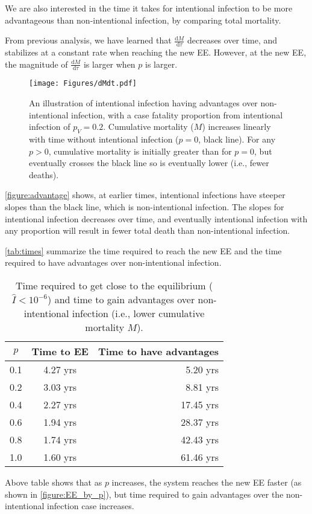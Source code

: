 \documentclass[12pt]{article}
\newcommand\dbyd[2]{\frac{\mathrm d{#1}}{\mathrm d{#2}}}
\newcommand{\pmV}{p_{V}}
\begin{document}
We are also interested in the time it takes for intentional infection to be more advantageous than non-intentional infection, by comparing total mortality.

From previous analysis, we have learned that $\dbyd{M}{\tau}$ decreases over time, and stabilizes at a constant rate when reaching the new EE. However, at the new EE, the magnitude of $\dbyd{M}{\tau}$ is larger when $p$ is larger.

\begin{figure}[H]
  \centering
  \texttt{[image: Figures/dMdt.pdf]}
  \caption{An illustration of intentional infection having advantages over non-intentional infection, with a case fatality proportion from intentional infection of $\pmV=0.2$.
Cumulative mortality ($M$) increases linearly with time without intentional infection ($p=0$, black line).
For any $p>0$, cumulative mortality is initially greater than for $p=0$, but eventually crosses the black line so is eventually lower (i.e., fewer deaths).}
\label{figure:advantage}
\end{figure}

\autoref{figure:advantage} shows, at earlier times, intentional infections have steeper slopes than the black line, which is non-intentional infection. The slopes for intentional infection decreases over time, and eventually intentional infection with any proportion will result in fewer total death than non-intentional infection.

\autoref{tab:times} summarize the time required to reach the new EE and the time required to have advantages over non-intentional infection.

\begin{table}[H]
\begin{center}
\caption{Time required to get close to the equilibrium ($\hat{I}<10^{-6}$) and time to gain advantages over non-intentional infection (i.e., lower cumulative mortality $M$).}
\label{tab:times}
\smallskip
\begin{tabular}{c|c|r}
{\bfseries $p$} & {\bfseries Time to EE} & {\bfseries Time to have advantages} \\\hline
0.1 & 4.27 yrs & 5.20 yrs \\
0.2 & 3.03 yrs & 8.81 yrs \\
0.4 & 2.27 yrs & 17.45 yrs \\
0.6 & 1.94 yrs & 28.37 yrs \\
0.8 & 1.74 yrs & 42.43 yrs \\
1.0 & 1.60 yrs & 61.46 yrs
\end{tabular}
\end{center}
\end{table}
Above table shows that as $p$ increases, the system reaches the new EE faster (as shown in \autoref{figure:EE_by_p}), but time required to gain advantages over the non-intentional infection case increases.
\end{document}

